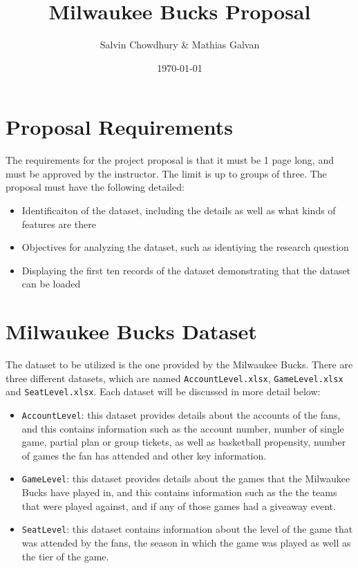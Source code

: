 \documentclass[a4paper]{article}
\title{Milwaukee Bucks Proposal}
\author{Salvin Chowdhury \& Mathias Galvan}
\date{\today}
\begin{document}
\maketitle

\newpage

\section{Proposal Requirements}
The requirements for the project proposal is that it must be 1 page long, and must be approved by the instructor. The
limit is up to groups of three. The proposal must have the following detailed:
\begin{itemize}
    \item Identificaiton of the dataset, including the details as well as what kinds of features are there
    \item Objectives for analyzing the dataset, such as identiying the research question
    \item Displaying the first ten records of the dataset demonstrating that the dataset can be loaded
\end{itemize}

\section{Milwaukee Bucks Dataset}
The dataset to be utilized is the one provided by the Milwaukee Bucks. There are three different datasets, which are
named \texttt{AccountLevel.xlsx}, \texttt{GameLevel.xlsx} and \texttt{SeatLevel.xlsx}. Each dataset will be discussed
in more detail below:

\begin{itemize}
    \item \texttt{AccountLevel}: this dataset provides details about the accounts of the fans, and this contains 
    information such as the account number, number of single game, partial plan or group tickets, as well as basketball
    propensity, number of games the fan has attended and other key information.
    \item \texttt{GameLevel}: this dataset provides details about the games that the Milwaukee Bucks have played in,
    and this contains information such as the the teams that were played against, and if any of those games had a 
    giveaway event.
    \item \texttt{SeatLevel}: this dataset contains information about the level of the game that was attended by the
    fans, the season in which the game was played as well as the tier of the game.
\end{itemize}
\end{document}

